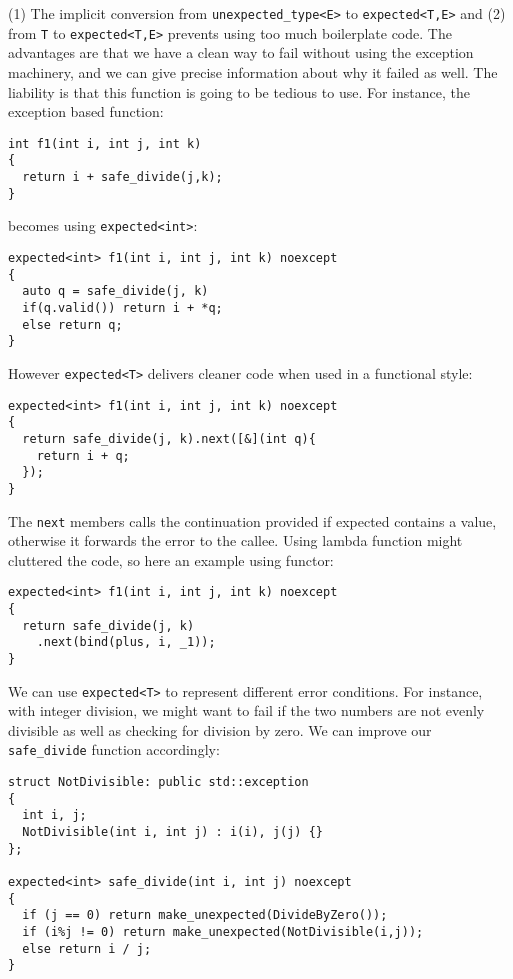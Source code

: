 \documentclass[a4paper,10pt]{article}
\newcommand{\cpp}[1]{\lstinline{#1}}
\begin{document}
(1) The implicit conversion from \cpp{unexpected_type<E>} to \cpp{expected<T,E>} and (2) from \cpp{T} to \cpp{expected<T,E>} prevents using too much boilerplate code. The advantages are that we have a clean way to fail without using the exception machinery, and we can give precise information about why it failed as well. The liability is that this function is going to be tedious to use. For instance, the exception based function:

\begin{lstlisting}
int f1(int i, int j, int k)
{
  return i + safe_divide(j,k);
}
\end{lstlisting}

\noindent
becomes using \texttt{expected<int>}:

\begin{lstlisting}
expected<int> f1(int i, int j, int k) noexcept
{
  auto q = safe_divide(j, k)
  if(q.valid()) return i + *q;
  else return q;
}
\end{lstlisting}

\noindent
However \cpp{expected<T>} delivers cleaner code when used in a functional style:

\begin{lstlisting}
expected<int> f1(int i, int j, int k) noexcept
{
  return safe_divide(j, k).next([&](int q){
    return i + q;
  });
}
\end{lstlisting}

The \cpp{next} members calls the continuation provided if expected contains a value, otherwise it forwards the error to the callee. Using lambda function might cluttered the code, so here an example using functor:

\begin{lstlisting}
expected<int> f1(int i, int j, int k) noexcept
{
  return safe_divide(j, k)
    .next(bind(plus, i, _1));
}
\end{lstlisting}

We can use \cpp{expected<T>} to represent different error conditions. For instance, with integer division, we might want to fail if the two numbers are not evenly divisible as well as checking for division by zero. We can improve our \cpp{safe_divide} function accordingly:

\begin{lstlisting}
struct NotDivisible: public std::exception
{
  int i, j;
  NotDivisible(int i, int j) : i(i), j(j) {}
};

expected<int> safe_divide(int i, int j) noexcept
{
  if (j == 0) return make_unexpected(DivideByZero()); 
  if (i%j != 0) return make_unexpected(NotDivisible(i,j));
  else return i / j; 
}
\end{lstlisting}
\end{document}
